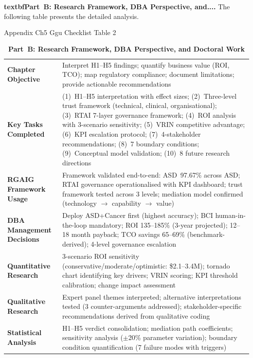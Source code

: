 \noindent\textbf{textbfPart~B: Research Framework, DBA Perspective, and....} The following table presents the detailed analysis.

\begin{table}[!htbp]
\caption{Appendix Ch5 Ggu Checklist Table 2}
\tablestripes
\caption*{\textbf{Part~B: Research Framework, DBA Perspective, and Doctoral Work}}
\tablefontsize
\begin{tabularx}{\textwidth}{@{} L L @{}}
\toprule
{} &  \\
\midrule
\textbf{Chapter Objective} & Interpret H1--H5 findings; quantify business value (ROI, TCO); map regulatory compliance; document limitations; provide actionable recommendations \\
\addlinespace
\textbf{Key Tasks Completed} & (1)~H1--H5 interpretation with effect sizes; (2)~Three-level trust framework (technical, clinical, organisational); (3)~RTAI 7-layer governance framework; (4)~ROI analysis with 3-scenario sensitivity; (5)~VRIN competitive advantage; (6)~KPI escalation protocol; (7)~4-stakeholder recommendations; (8)~7 boundary conditions; (9)~Conceptual model validation; (10)~8 future research directions \\
\addlinespace
\textbf{RGAIG Framework Usage} & Framework validated end-to-end: ASD~97.67\% across ASD; RTAI governance operationalised with KPI dashboard; trust framework tested across 3 levels; mediation model confirmed (technology $\to$ capability $\to$ value) \\
\addlinespace
\textbf{DBA Management Decisions} & Deploy ASD+Cancer first (highest accuracy); BCI human-in-the-loop mandatory; ROI 135--185\% (3-year projected); 12--18 month payback; TCO savings 65--69\% (benchmark-derived); 4-level governance escalation \\
\addlinespace
\textbf{Quantitative Research} & 3-scenario ROI sensitivity (conservative/moderate/optimistic: \$2.1--3.4M); tornado chart identifying key drivers; VRIN scoring; KPI threshold calibration; change impact assessment \\
\addlinespace
\textbf{Qualitative Research} & Expert panel themes interpreted; alternative interpretations tested (3 counter-arguments addressed); stakeholder-specific recommendations derived from qualitative coding \\
\addlinespace
\textbf{Statistical Analysis} & H1--H5 verdict consolidation; mediation path coefficients; sensitivity analysis ($\pm$20\% parameter variation); boundary condition quantification (7 failure modes with triggers) \\

\end{tabularx}
\end{table}
